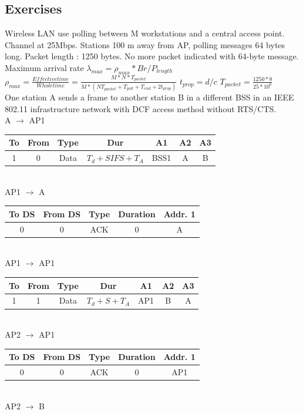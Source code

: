 \documentclass[6pt]{scrartcl}
\begin{document}
\begin{multicols}{4}
\subsection{Exercises}
Wireless LAN use polling between M workstations and a central access point. Channel at 25Mbps. Stations 100 m away from AP, polling messages 64 bytes long. Packet length : 1250 bytes. No more packet indicated with 64-byte message. Maximum arrival rate $\lambda_{max} = \rho_{max} * Br/P_{length}$ $\rho_{max}=\frac{Effective time}{Whole time}=\frac{M*N*T_{packet}}{M*(NT_{packet}+T_{poll}+T_{end}+2t_{prop})}$ $t_{prop}=d/c$ $T_{packet}=\frac{1250*8}{25*10^6}$\\
One station A sends a frame to another station B in a different BSS in
an IEEE 802.11 infrastructure network with DCF access method without RTS/CTS.
\\
A $\rightarrow$ AP1 \\
\begin{tabular}{|c|c|c|c|c|c|c|}
  \hline
  To & From & Type & Dur & A1 & A2 & A3 \\
  \hline
  1 & 0 & Data & $T_{d}+SIFS+T_{A}$ & BSS1 & A & B \\
  \hline
\end{tabular}\\
AP1 $\rightarrow$ A\\
\begin{tabular}{|c|c|c|c|c|}
  \hline
  To DS & From DS & Type & Duration & Addr. 1 \\
  \hline
  0 & 0 & ACK & 0 & A \\
  \hline
\end{tabular}
\\
AP1 $\rightarrow$ AP1 \\
\begin{tabular}{|c|c|c|c|c|c|c|}
  \hline
  To & From & Type & Dur & A1 & A2 & A3 \\
  \hline
  1 & 1 & Data & $T_{d} + S + T_{A}$ & AP1 & B & A \\
  \hline
\end{tabular}\\
AP2 $\rightarrow$ AP1\\
\begin{tabular}{|c|c|c|c|c|}
  \hline
  To DS & From DS & Type & Duration & Addr. 1 \\
  \hline
  0 & 0 & ACK & 0 & AP1 \\
  \hline
\end{tabular}
\\
AP2 $\rightarrow$ B \\

\end{multicols}
\end{document}
